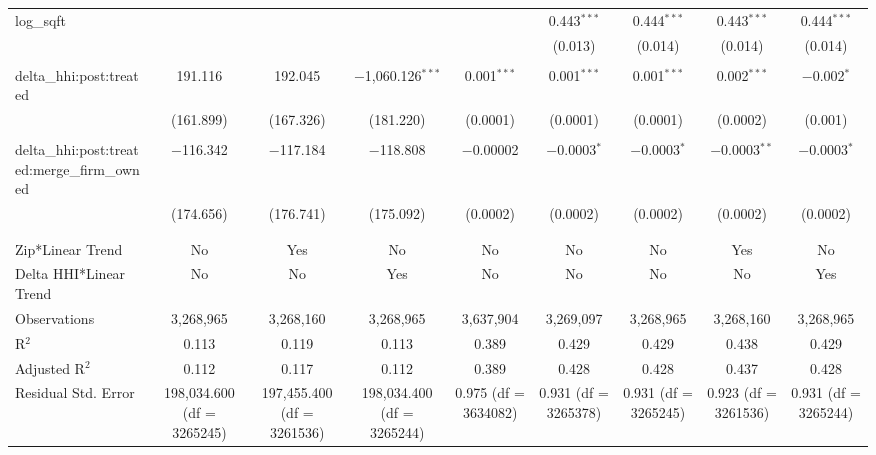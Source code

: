 \begin{table}[H]
{\begin{tabular}{@{\extracolsep{5pt}}lcccccccc}
  log\_sqft &  &  &  &  & 0.443$^{***}$ & 0.444$^{***}$ & 0.443$^{***}$ & 0.444$^{***}$ \\  

   &  &  &  &  & (0.013) & (0.014) & (0.014) & (0.014) \\  

   & & & & & & & & \\  

  delta\_hhi:post:treated & 191.116 & 192.045 & $-$1,060.126$^{***}$ & 0.001$^{***}$ & 0.001$^{***}$ & 0.001$^{***}$ & 0.002$^{***}$ & $-$0.002$^{*}$ \\  

   & (161.899) & (167.326) & (181.220) & (0.0001) & (0.0001) & (0.0001) & (0.0002) & (0.001) \\  

   & & & & & & & & \\  

  delta\_hhi:post:treated:merge\_firm\_owned & $-$116.342 & $-$117.184 & $-$118.808 & $-$0.00002 & $-$0.0003$^{*}$ & $-$0.0003$^{*}$ & $-$0.0003$^{**}$ & $-$0.0003$^{*}$ \\  

   & (174.656) & (176.741) & (175.092) & (0.0002) & (0.0002) & (0.0002) & (0.0002) & (0.0002) \\  

   & & & & & & & & \\  

 \hline \\[-1.8ex]  

 Zip*Linear Trend & No & Yes & No & No & No & No & Yes & No \\  

 Delta HHI*Linear Trend & No & No & Yes & No & No & No & No & Yes \\  

 Observations & 3,268,965 & 3,268,160 & 3,268,965 & 3,637,904 & 3,269,097 & 3,268,965 & 3,268,160 & 3,268,965 \\  

 R$^{2}$ & 0.113 & 0.119 & 0.113 & 0.389 & 0.429 & 0.429 & 0.438 & 0.429 \\  

 Adjusted R$^{2}$ & 0.112 & 0.117 & 0.112 & 0.389 & 0.428 & 0.428 & 0.437 & 0.428 \\  

 Residual Std. Error & 198,034.600 (df = 3265245) & 197,455.400 (df = 3261536) & 198,034.400 (df = 3265244) & 0.975 (df = 3634082) & 0.931 (df = 3265378) & 0.931 (df = 3265245) & 0.923 (df = 3261536) & 0.931 (df = 3265244) \\  


\end{tabular}}
\end{table}
